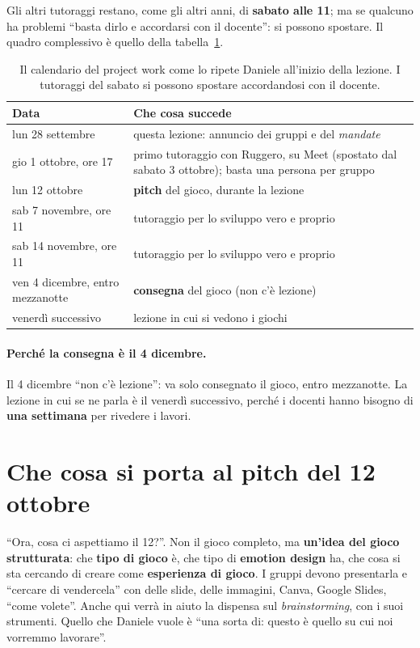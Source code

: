 Gli altri tutoraggi restano, come gli altri anni, di \textbf{sabato alle 11}; ma se
qualcuno ha problemi ``basta dirlo e accordarsi con il docente'': si possono
spostare. Il quadro complessivo è quello della tabella~\ref{a7:tab:calendario}.

\begin{table}[htbp]
\centering
\begin{tabular}{@{}lp{9.0cm}@{}}
\toprule
\textbf{Data} & \textbf{Che cosa succede} \\
\midrule
lun 28 settembre & questa lezione: annuncio dei gruppi e del \emph{mandate} \\
gio 1 ottobre, ore 17 & primo tutoraggio con Ruggero, su Meet (spostato dal
sabato 3 ottobre); basta una persona per gruppo \\
lun 12 ottobre & \textbf{pitch} del gioco, durante la lezione \\
sab 7 novembre, ore 11 & tutoraggio per lo sviluppo vero e proprio \\
sab 14 novembre, ore 11 & tutoraggio per lo sviluppo vero e proprio \\
ven 4 dicembre, entro mezzanotte & \textbf{consegna} del gioco (non c'è lezione) \\
venerdì successivo & lezione in cui si vedono i giochi \\
\bottomrule
\end{tabular}
\caption{Il calendario del project work come lo ripete Daniele all'inizio della
lezione. I tutoraggi del sabato si possono spostare accordandosi con il docente.}
\label{a7:tab:calendario}
\end{table}

\paragraph{Perché la consegna è il 4 dicembre.} Il 4 dicembre ``non c'è lezione'':
va solo consegnato il gioco, entro mezzanotte. La lezione in cui se ne parla è il
venerdì successivo, perché i docenti hanno bisogno di \textbf{una settimana} per
rivedere i lavori.

\section{Che cosa si porta al pitch del 12 ottobre}
\label{a7:sec:pitch}

``Ora, cosa ci aspettiamo il 12?''. Non il gioco completo, ma \textbf{un'idea del
gioco strutturata}: che \textbf{tipo di gioco} è, che tipo di \textbf{emotion design}
ha, che cosa si sta cercando di creare come \textbf{esperienza di gioco}. I gruppi
devono presentarla e ``cercare di vendercela'' con delle slide, delle immagini,
Canva, Google Slides, ``come volete''. Anche qui verrà in aiuto la dispensa sul
\emph{brainstorming}, con i suoi strumenti. Quello che Daniele vuole è ``una sorta
di: questo è quello su cui noi vorremmo lavorare''.

